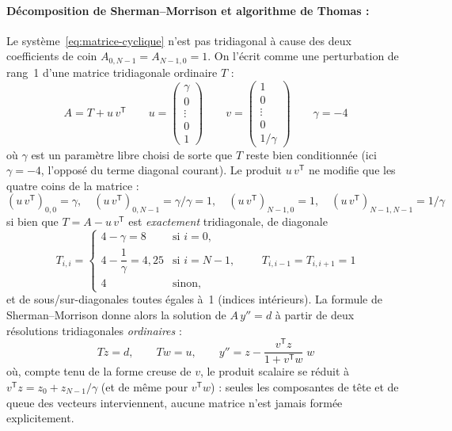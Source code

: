 \documentclass{tropLaClasse}
\begin{document}
\paragraph{Décomposition de Sherman--Morrison et algorithme de Thomas :} Le système~\eqref{eq:matrice-cyclique} n'est pas tridiagonal à cause des deux coefficients de coin $A_{0,N-1} = A_{N-1,0} = 1$. On l'écrit comme une perturbation de rang~1 d'une matrice tridiagonale ordinaire $T$ :
\begin{equation}
    A = T + u\,v^{\mathsf{T}} \qquad
    u = \begin{pmatrix} \gamma \\ 0 \\ \vdots \\ 0 \\ 1 \end{pmatrix} \qquad
    v = \begin{pmatrix} 1 \\ 0 \\ \vdots \\ 0 \\ 1/\gamma \end{pmatrix}
    \qquad \gamma = -4
    \label{eq:sherman-morrison-setup}
\end{equation}
où $\gamma$ est un paramètre libre choisi de sorte que $T$ reste bien conditionnée (ici $\gamma = -4$, l'opposé du terme diagonal courant). Le produit $u\,v^{\mathsf{T}}$ ne modifie que les quatre coins de la matrice :
\begin{equation}
    (u\,v^{\mathsf{T}})_{0,0} = \gamma, \quad
    (u\,v^{\mathsf{T}})_{0,N-1} = \gamma/\gamma = 1, \quad
    (u\,v^{\mathsf{T}})_{N-1,0} = 1, \quad
    (u\,v^{\mathsf{T}})_{N-1,N-1} = 1/\gamma
\end{equation}
si bien que $T = A - u\,v^{\mathsf{T}}$ est \emph{exactement} tridiagonale, de diagonale
\begin{equation}
    T_{i,i} =
    \begin{cases}
        4 - \gamma = 8 & \text{si } i = 0, \\[2pt]
        4 - \dfrac{1}{\gamma} = 4{,}25 & \text{si } i = N-1, \\[6pt]
        4 & \text{sinon,}
    \end{cases}
    \qquad T_{i,i-1} = T_{i,i+1} = 1
    \label{eq:T-diag}
\end{equation}
et de sous/sur-diagonales toutes égales à~1 (indices intérieurs). La formule de Sherman--Morrison donne alors la solution de $A\,y'' = d$ à partir de deux résolutions tridiagonales \emph{ordinaires} :
\begin{equation}
    T z = d, \qquad T w = u, \qquad
    y'' = z - \frac{v^{\mathsf{T}} z}{1 + v^{\mathsf{T}} w}\; w
    \label{eq:sherman-morrison-solution}
\end{equation}
où, compte tenu de la forme creuse de $v$, le produit scalaire se réduit à $v^{\mathsf{T}} z = z_0 + z_{N-1}/\gamma$ (et de même pour $v^{\mathsf{T}} w$) : seules les composantes de tête et de queue des vecteurs interviennent, aucune matrice n'est jamais formée explicitement.\\
\end{document}
